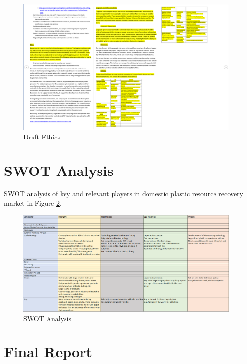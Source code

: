 \documentclass[11pt, a4, nocenter, margin=150mm]{article}
\begin{document}
\begin{appendices}
	\begin{figure}[h!]
		\centering
		\includegraphics[width=\textwidth]{week9/draft_ethics_csr.png}
		\caption{Draft Ethics}
		\label{fig:ethics}
	\end{figure}

\pagebreak

\section{SWOT Analysis}
\label{app:swot}

	SWOT analysis of key and relevant players in domestic plastic resource recovery market in Figure \ref{fig:swot}.

	\begin{figure}[h!]
		\centering
		\includegraphics[width=\textwidth]{week8/swot_analysis.png}
		\caption{SWOT Analysis}
		\label{fig:swot}
	\end{figure}

\pagebreak

\section{Final Report}
\label{app:final}


\end{appendices}
\end{document}
